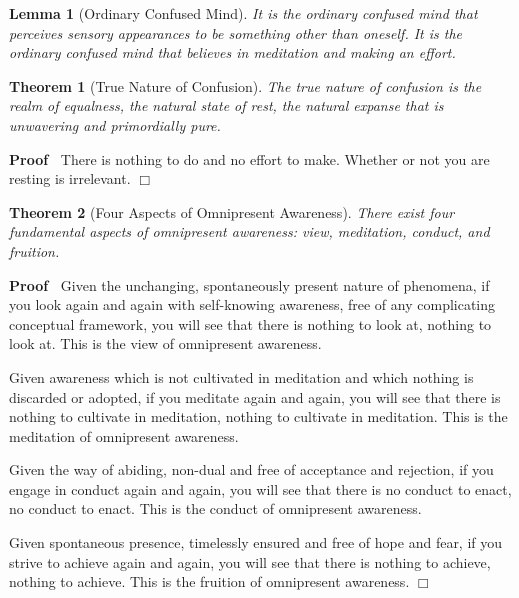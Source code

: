 \documentclass{article}
\newcommand{\tmtextbf}[1]{\text{{\bfseries{#1}}}}
\newenvironment{proof}{\noindent\textbf{Proof\ }}{\hspace*{\fill}$\Box$\medskip}
\newtheorem{lemma}{Lemma}
\newtheorem{theorem}{Theorem}
\begin{document}
\begin{lemma}
  [Ordinary Confused Mind] It is the ordinary confused mind that perceives
  sensory appearances to be something other than oneself. It is the ordinary
  confused mind that believes in meditation and making an effort.
\end{lemma}

\begin{theorem}
  [True Nature of Confusion] The true nature of confusion is the realm of
  equalness, the natural state of rest, the natural expanse that is unwavering
  and primordially pure.
\end{theorem}

\begin{proof}
  There is nothing to do and no effort to make. Whether or not you are resting
  is irrelevant.
\end{proof}

\begin{theorem}
  [Four Aspects of Omnipresent Awareness] There exist four fundamental aspects
  of omnipresent awareness: view, meditation, conduct, and fruition.
\end{theorem}

\begin{proof}
  \tmtextbf{View:} Given the unchanging, spontaneously present nature of
  phenomena, if you look again and again with self-knowing awareness, free of
  any complicating conceptual framework, you will see that there is nothing to
  look at, nothing to look at. This is the view of omnipresent awareness.
  
  \tmtextbf{Meditation:} Given awareness which is not cultivated in meditation
  and which nothing is discarded or adopted, if you meditate again and again,
  you will see that there is nothing to cultivate in meditation, nothing to
  cultivate in meditation. This is the meditation of omnipresent awareness.
  
  \tmtextbf{Conduct:} Given the way of abiding, non-dual and free of
  acceptance and rejection, if you engage in conduct again and again, you will
  see that there is no conduct to enact, no conduct to enact. This is the
  conduct of omnipresent awareness.
  
  \tmtextbf{Fruition:} Given spontaneous presence, timelessly ensured and free
  of hope and fear, if you strive to achieve again and again, you will see
  that there is nothing to achieve, nothing to achieve. This is the fruition
  of omnipresent awareness.
\end{proof}
\end{document}
